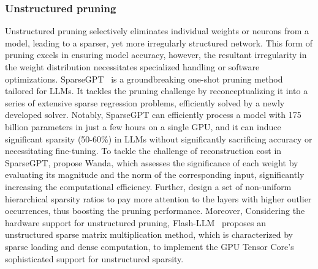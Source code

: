 \subsubsection{Unstructured pruning} 
Unstructured pruning selectively eliminates individual weights or neurons from a model, leading to a sparser, yet more irregularly structured network. This form of pruning excels in ensuring model accuracy, however, the resultant irregularity in the weight distribution necessitates specialized handling or software optimizations.
SparseGPT~\citep{frantar2023sparsegpt} is a groundbreaking one-shot pruning method tailored for LLMs. It tackles the pruning challenge by reconceptualizing it into a series of extensive sparse regression problems, efficiently solved by a newly developed solver. Notably, SparseGPT can efficiently process a model with 175 billion parameters in just a few hours on a single GPU, and it can induce significant sparsity (50-60\%) in LLMs without significantly sacrificing accuracy or necessitating fine-tuning. 
To tackle the challenge of reconstruction cost in SparseGPT, \cite{sun2023simple} propose Wanda, which assesses the significance of each weight by evaluating its magnitude and the norm of the corresponding input, significantly increasing the computational efficiency.
Further, \cite{yin2023outlier} design a set of non-uniform hierarchical sparsity ratios to pay more attention to the layers with higher outlier occurrences, thus boosting the pruning performance.
Moreover, Considering the hardware support for unstructured pruning, Flash-LLM~\citep{xia2023flash} proposes an unstructured sparse matrix multiplication method, which is characterized by sparse loading and dense computation, to implement the GPU Tensor Core's sophisticated support for unstructured sparsity.


